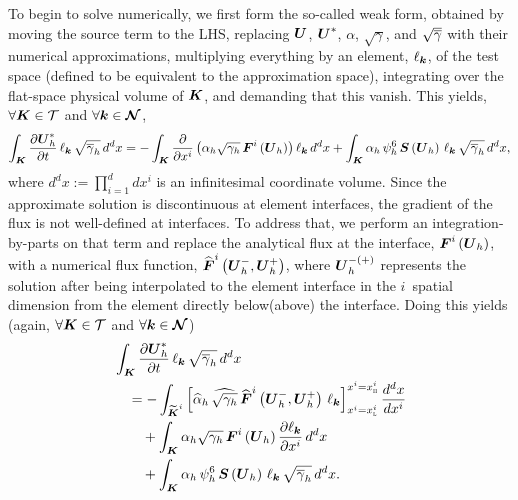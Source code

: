 To begin to solve  numerically, we first form the
so-called weak form, obtained by moving the source term to the LHS,
replacing $\boldsymbol{U}$, $\boldsymbol{U}^{*}$, $\alpha$, $\sqrt{\gamma}$,
and $\sqrt{\overline{\gamma}}$ with their numerical approximations,
multiplying everything by an element, $\ell_{\boldsymbol{k}}$,
of the test space
(defined to be equivalent to the approximation space),
integrating over the flat-space physical volume of $\boldsymbol{K}$,
and demanding that this vanish.
This yields, $\forall\boldsymbol{K}\in\mathcal{T}$
and $\forall\boldsymbol{k}\in\boldsymbol{\mathcal{N}}$,
\begin{align}
  \int_{\boldsymbol{K}}\frac{\partial\boldsymbol{U}_{h}^{*}}{\partial t}\,
  \ell_{\boldsymbol{k}}\,\sqrt{\overline{\gamma}_{h}}\,d^{d}x
  =-\int_{\boldsymbol{K}}\frac{\partial}{\partial x^{i}}
  \left(\alpha_{h}\sqrt{\gamma_{h}}\,\boldsymbol{F}^{i}\left(\boldsymbol{U}_{h}\right)\right)
  \ell_{\boldsymbol{k}}\,d^{d}x
  +\int_{\boldsymbol{K}}\alpha_{h}\,\psi_{h}^{6}\,\boldsymbol{S}\left(\boldsymbol{U}_{h}\right)\,
  \ell_{\boldsymbol{k}}\,\sqrt{\overline{\gamma}_{h}}\,d^{d}x,
\end{align}
where $d^{d}x:=\prod_{i=1}^{d}dx^{i}$ is an infinitesimal coordinate volume.
Since the approximate solution is discontinuous at element interfaces,
the gradient of the flux is not well-defined at interfaces.
To address that, we perform an integration-by-parts on that term
and replace the analytical flux at the interface,
$\boldsymbol{F}^{i}\left(\boldsymbol{U}_{h}\right)$,
with a numerical flux function,
$\widehat{\boldsymbol{F}}^{i}\left(\boldsymbol{U}_{h}^{-},\boldsymbol{U}_{h}^{+}\right)$,
where $\boldsymbol{U}_{h}^{-(+)}$ represents the solution after being interpolated
to the element interface in the $i$\myth\ spatial dimension from the element
directly below(above) the interface.
Doing this yields
(again, $\forall\boldsymbol{K}\in\mathcal{T}$ and
$\forall\boldsymbol{k}\in\boldsymbol{\mathcal{N}}$)
\begin{align}
\begin{split}
  &\int_{\boldsymbol{K}}\frac{\partial\boldsymbol{U}_{h}^{*}}{\partial t}\,
  \ell_{\boldsymbol{k}}\,\sqrt{\overline{\gamma}_{h}}\,d^{d}x \\
  &\hspace{1em}=-\int_{\widetilde{\boldsymbol{K}}^{i}}
  \left[\widehat{\alpha}_{h}\,
  \widehat{\sqrt{\gamma_{h}}}\,
  \widehat{\boldsymbol{F}}^{i}\left(\boldsymbol{U}_{h}^{-},\boldsymbol{U}_{h}^{+}\right)
  \,\ell_{\boldsymbol{k}}
  \right]^{x^{i}=x^{i}_{\textsc{h}}}_{x^{i}=x^{i}_{\textsc{l}}}
  \frac{d^{d}x}{dx^{i}} \\
  &\hspace{2em}+\int_{\boldsymbol{K}}
  \alpha_{h}\sqrt{\gamma_{h}}\,\boldsymbol{F}^{i}\left(\boldsymbol{U}_{h}\right)
  \frac{\partial\ell_{\boldsymbol{k}}}{\partial x^{i}}\,d^{d}x \\
  &\hspace{2em}+\int_{\boldsymbol{K}}
  \alpha_{h}\,\psi_{h}^{6}\,\boldsymbol{S}\left(\boldsymbol{U}_{h}\right)\,
  \ell_{\boldsymbol{k}}\,\sqrt{\overline{\gamma}_{h}}\,d^{d}x.
  \label{eq.weak1}
\end{split}
\end{align}
